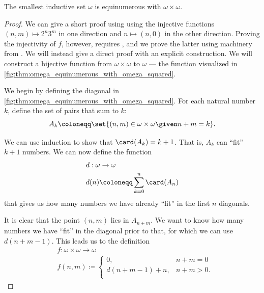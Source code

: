 \begin{proposition}\label{thm:omega_equinumerous_with_omega_squared}
  The smallest inductive set \( \omega \) is equinumerous with \( \omega \times \omega \).
\end{proposition}
\begin{proof}
  We can give a short proof using  using the injective functions \( (n, m) \mapsto 2^n 3^m \) in one direction and \( n \mapsto (n, 0) \) in the other direction. Proving the injectivity of \( f \), however, requires , and we prove the latter using machinery from . We will instead give a direct proof with an explicit construction. We will construct a bijective function from \( \omega \times \omega \) to \( \omega \) --- the function visualized in \cref{fig:thm:omega_equinumerous_with_omega_squared}.

  We begin by defining the diagonal in \cref{fig:thm:omega_equinumerous_with_omega_squared}. For each natural number \( k \), define the set of pairs that sum to \( k \):
  \begin{equation*}
    A_k \coloneqq \set{ (n, m) \in \omega \times \omega \given n + m = k }.
  \end{equation*}

  We can use induction to show that \( \card(A_k) = k + 1 \). That is, \( A_k \) can \enquote{fit} \( k + 1 \) numbers. We can now define the function
  \begin{equation*}
    \begin{aligned}
      &d: \omega \to \omega \\
      &d(n) \coloneqq \sum_{k=0}^n \card(A_n)
    \end{aligned}
  \end{equation*}
  that gives us how many numbers we have already \enquote{fit} in the first \( n \) diagonals.

  It is clear that the point \( (n, m) \) lies in \( A_{n + m} \). We want to know how many numbers we have \enquote{fit} in the diagonal prior to that, for which we can use \( d(n + m - 1) \). This leads us to the definition
  \begin{equation*}
    \begin{aligned}
      &f: \omega \times \omega \to \omega \\
      &f(n, m) \coloneqq \begin{cases}
        0,                &n + m = 0 \\
        d(n + m - 1) + n, &n + m > 0. \\
      \end{cases}
    \end{aligned}
  \end{equation*}


\end{proof}
